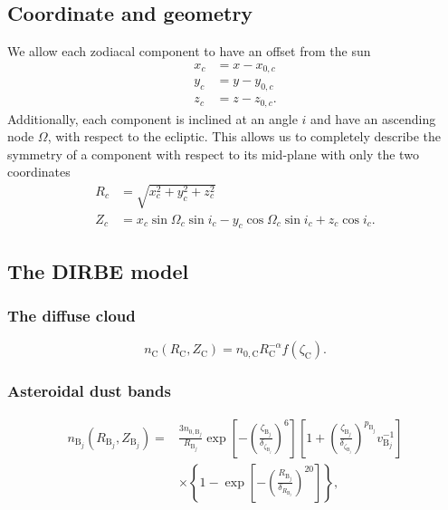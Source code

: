 \documentclass{aa}
\begin{document}
\subsection{Coordinate and geometry}
We allow each zodiacal component to have an offset from the sun
\begin{equation}
    \begin{aligned}
    x_c&= x - x_{0,c}\\
    y_c&= y - y_{0,c}\\
    z_c&= z - z_{0,c}.
    \end{aligned}
\end{equation}
Additionally, each component is inclined at an angle $i$ and have an ascending node $\Omega$, with respect to the ecliptic. This allows us to completely describe the symmetry of a component with respect to its mid-plane with only the two coordinates
\begin{align}
    R_c &= \sqrt{x_c^2 + y_c^2 + z_c^2}\\
    Z_c &= x_c\sin{\Omega_c}\sin{i_c} - y_c \cos{\Omega_c}\sin{i_c} + z_c \cos{i_c}.
\end{align}

\subsection{The DIRBE model}

\subsubsection{The diffuse cloud}
\begin{equation}
n_\mathrm{C}(R_\mathrm{C}, Z_\mathrm{C}) = n_{0,\mathrm{C}} R_\mathrm{C}^{-\alpha} f(\zeta_\mathrm{C}).
\end{equation}
\subsubsection{Asteroidal dust bands}
\begin{equation}
    \begin{aligned}
        n_{\mathrm{B}_j}(R_{\mathrm{B}_j}, Z_{\mathrm{B}_j})=& \frac{3 n_{0, \mathrm{B}_j}}{R_{\mathrm{B}_j}} \exp \left[-\left(\frac{\zeta_{\mathrm{B}_j}}{\delta_{\zeta_{\mathrm B_j}}}\right)^{6}\right]\left[1 + \left(\frac{\zeta_{\mathrm{B}_j}}{\delta_{\zeta_{\mathrm{B}_j}}}\right)^{p_{\mathrm{B}_j}}v^{-1}_{\mathrm{B}_j}\right] \\
        & \times\left\{1-\exp \left[-\left(\frac{R_{\mathrm{B}_j}}{\delta_{R_{\mathrm{B}_j}}}\right)^{20}\right]\right\},
    \end{aligned}
\end{equation}
\end{document}
